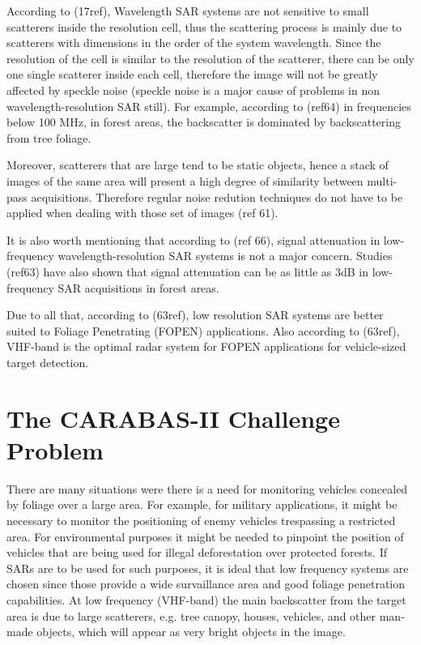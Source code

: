 According to (17ref), Wavelength SAR systems are not sensitive to small scatterers inside the resolution cell,
thus the scattering process is mainly due to scatterers with dimensions in the order of the system wavelength.
Since the resolution of the cell is similar to the resolution of the scatterer, there can be only one single scatterer inside each cell, 
therefore the image will not be greatly affected by speckle noise (speckle noise is a major cause of problems in non wavelength-resolution SAR still). For example, according to (ref64)
in frequencies below 100 MHz, in forest areas, the backscatter is dominated by backscattering from tree foliage.

Moreover, scatterers that are large tend to be static objects, hence a stack of images of the same area will present a high degree of 
similarity between multi-pass acquisitions. Therefore regular noise redution techniques do not have to be applied when dealing with those set of images (ref 61).

It is also worth mentioning that according to (ref 66), signal attenuation in low-frequency wavelength-resolution SAR systems 
is not a major concern. Studies (ref63) have also shown that signal attenuation can be as little as 3dB in low-frequency SAR acquisitions in forest areas.


Due to all that, according to (63ref), low resolution SAR systems are better suited to Foliage Penetrating (FOPEN) applications.
Also according to (63ref), VHF-band is the optimal radar system for FOPEN applications for vehicle-sized target detection.

\section{The CARABAS-II Challenge Problem}
There are many situations were there is a need for monitoring vehicles concealed by foliage over a large area.
For example, for military applications, it might be necessary to monitor the positioning of enemy vehicles trespassing
a restricted area. For environmental purposes it might be needed to pinpoint the position of vehicles that are being used
for illegal deforestation over protected forests. If SARs are to be used for such purposes, it is ideal that low frequency systems
are chosen since those provide a wide survaillance area and good foliage penetration capabilities. 
At low frequency (VHF-band) the main backscatter from the target area is due to large scatterers, e.g. tree canopy, houses,
vehicles, and other man-made objects, which will appear as very bright objects in the image.

